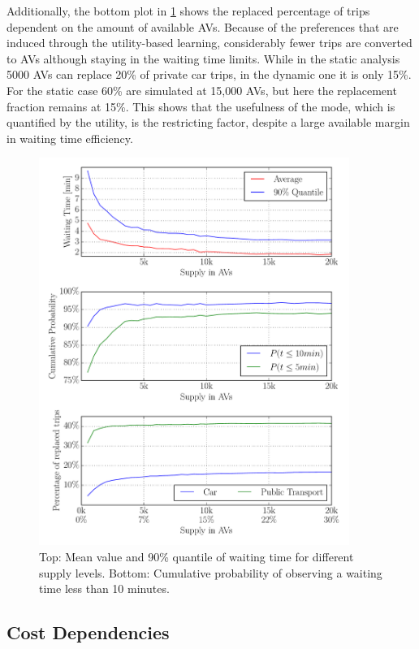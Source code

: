 Additionally, the bottom plot in \cref{fig:waitingsupply} shows the replaced
percentage of trips dependent on the amount of available AVs. Because of the
preferences that are induced through the utility-based learning, considerably
fewer trips are converted to AVs although staying in the waiting time limits.
While in the static analysis 5000 AVs can replace 20\% of private car trips,
in the dynamic one it is only 15\%. For the static case 60\% are simulated
at 15,000 AVs, but here the replacement fraction remains at 15\%. This shows
that the usefulness of the mode, which is quantified by the utility, is the
restricting factor, despite a large available margin in waiting time efficiency.

\begin{figure}
    \centering
    \includegraphics[width=0.9\textwidth]{figures/waitingsupply.pdf}
    \caption{Top: Mean value and 90\% quantile of waiting time for different supply
    levels. Bottom: Cumulative probability of observing a waiting time less than
    10 minutes.}
    \label{fig:waitingsupply}
\end{figure}

\subsection{Cost Dependencies}
\label{sec:costs}

